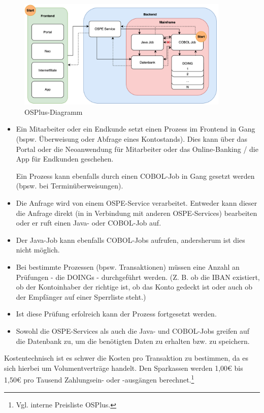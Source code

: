\documentclass[12pt, a4paper]{article}
\begin{document}
{\begin{figure}[ht]
    \centering\includegraphics[width=0.9\textwidth]{Abbildungen/OSPlus-Diagramm.png}
    \caption{OSPlus-Diagramm}
\end{figure}

\begin{itemize}
    \item Ein Mitarbeiter oder ein Endkunde setzt einen Prozess im Frontend in Gang (bspw. Überweisung oder Abfrage eines Kontostands).
    Dies kann über das Portal oder die Neoanwendung für Mitarbeiter oder das Online-Banking / die App für Endkunden geschehen.

    Ein Prozess kann ebenfalls durch einen COBOL-Job in Gang gesetzt werden (bpsw. bei Terminüberweisungen).
    \item Die Anfrage wird von einem OSPE-Service verarbeitet.
    Entweder kann dieser die Anfrage direkt (in in Verbindung mit anderen OSPE-Services) bearbeiten oder er ruft einen Java- oder COBOL-Job auf.
    \item Der Java-Job kann ebenfalls COBOL-Jobs aufrufen, andersherum ist dies nicht möglich.
    \item Bei bestimmte Prozessen (bpsw. Transaktionen) müssen eine Anzahl an Prüfungen - die DOINGs - durchgeführt werden. 
    (Z. B. ob die IBAN existiert, ob der Kontoinhaber der richtige ist, ob das Konto gedeckt ist oder auch ob der Empfänger auf einer Sperrliste steht.) 
    \item Ist diese Prüfung erfolreich kann der Prozess fortgesetzt werden.
    \item Sowohl die OSPE-Services als auch die Java- und COBOL-Jobs greifen auf die Datenbank zu, um die benötigten Daten zu erhalten bzw. zu speichern. 
\end{itemize}

Kostentechnisch ist es schwer die Kosten pro Transaktion zu bestimmen, da es sich hierbei um Volumentverträge handelt.
Den Sparkassen werden 1,00€ bis 1,50€ pro Tausend Zahlungsein- oder -ausgängen berechnet.\footnote{Vgl. interne Preisliste OSPlus.}

}
\end{document}
